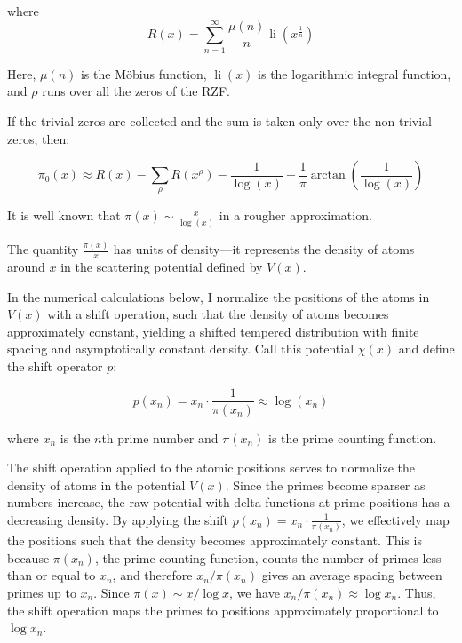 \documentclass[11pt, oneside]{article}
\begin{document}
where
\begin{equation}
R(x) = \sum_{n=1}^{\infty}\frac{\mu(n)}{n}\operatorname{li}(x^{\frac{1}{n}})
\end{equation}

Here, $\mu(n)$ is the Möbius function, $\operatorname{li}(x)$ is the logarithmic integral function, and $\rho$ runs over all the zeros of the RZF.

If the trivial zeros are collected and the sum is taken only over the non-trivial zeros, then:

\begin{equation}
\pi_0(x) \approx R(x) - \sum_{\rho}R(x^{\rho}) - \frac{1}{\log(x)} + \frac{1}{\pi}\arctan\left(\frac{1}{\log(x)}\right)
\end{equation}
 
It is well known that $\pi(x) \sim \frac{x}{\log(x)}$ in a rougher approximation.

The quantity $\frac{\pi(x)}{x}$ has units of density—it represents the density of atoms around $x$ in the scattering potential defined by $V(x)$.

In the numerical calculations below, I normalize the positions of the atoms in $V(x)$ with a shift operation, such that the density of atoms becomes approximately constant, yielding a shifted tempered distribution with finite spacing and asymptotically constant density. Call this potential $\chi(x)$ and define the shift operator $p$:

\begin{equation}
p(x_n) = x_n \cdot \frac{1}{\pi(x_n)} \approx \log(x_n)
\end{equation}

where $x_n$ is the $n$th prime number and $\pi(x_n)$ is the prime counting function.

The shift operation applied to the atomic positions serves to normalize the density of atoms in the potential $V(x)$. Since the primes become sparser as numbers increase, the raw potential with delta functions at prime positions has a decreasing density. By applying the shift $p(x_n) = x_n \cdot \frac{1}{\pi(x_n)}$, we effectively map the positions such that the density becomes approximately constant. This is because $\pi(x_n)$, the prime counting function, counts the number of primes less than or equal to $x_n$, and therefore $x_n / \pi(x_n)$ gives an average spacing between primes up to $x_n$. Since $\pi(x) \sim x / \log x$, we have $x_n / \pi(x_n) \approx \log x_n$. Thus, the shift operation maps the primes to positions approximately proportional to $\log x_n$.
\end{document}
